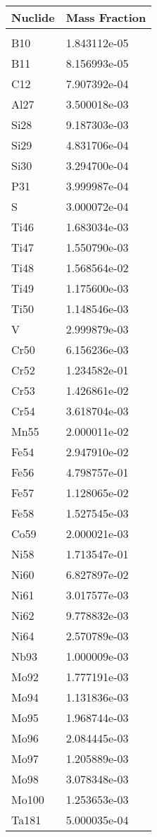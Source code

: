 \begin{centering}
\begin{longtable}[ht!]
{ p{} | p{} }
\hline
Nuclide & Mass Fraction\\
\hline
\\
B10 & 1.843112e-05\\
B11 & 8.156993e-05\\
C12 & 7.907392e-04\\
Al27 & 3.500018e-03\\
Si28 & 9.187303e-03\\
Si29 & 4.831706e-04\\
Si30 & 3.294700e-04\\
P31 & 3.999987e-04\\
S & 3.000072e-04\\
Ti46 & 1.683034e-03\\
Ti47 & 1.550790e-03\\
Ti48 & 1.568564e-02\\
Ti49 & 1.175600e-03\\
Ti50 & 1.148546e-03\\
V & 2.999879e-03\\
Cr50 & 6.156236e-03\\
Cr52 & 1.234582e-01\\
Cr53 & 1.426861e-02\\
Cr54 & 3.618704e-03\\
Mn55 & 2.000011e-02\\
Fe54 & 2.947910e-02\\
Fe56 & 4.798757e-01\\
Fe57 & 1.128065e-02\\
Fe58 & 1.527545e-03\\
Co59 & 2.000021e-03\\
Ni58 & 1.713547e-01\\
Ni60 & 6.827897e-02\\
Ni61 & 3.017577e-03\\
Ni62 & 9.778832e-03\\
Ni64 & 2.570789e-03\\
Nb93 & 1.000009e-03\\
Mo92 & 1.777191e-03\\
Mo94 & 1.131836e-03\\
Mo95 & 1.968744e-03\\
Mo96 & 2.084445e-03\\
Mo97 & 1.205889e-03\\
Mo98 & 3.078348e-03\\
Mo100 & 1.253653e-03\\
Ta181 & 5.000035e-04\\


\end{longtable}
\end{centering}
